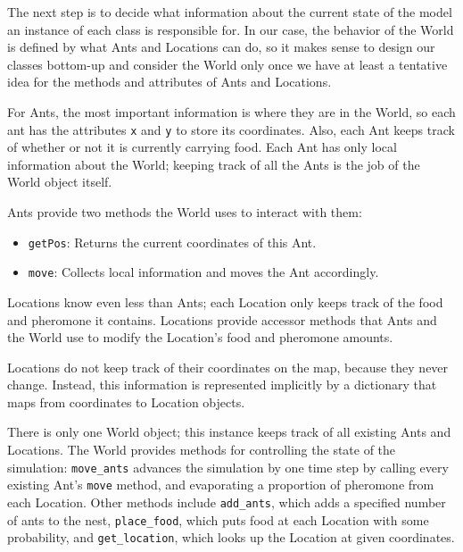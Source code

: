 \documentclass[10pt]{book}
\begin{document}
The next step is to decide what information about the current state of
the model an instance of each class is responsible for. In our case,
the behavior of the World is defined by what Ants and Locations
can do, so it makes sense to design our classes bottom-up and consider
the World only once we have at least a tentative idea for the methods
and attributes of Ants and Locations.

For Ants, the most important information is where they are in the
World, so each ant has the attributes \texttt{x} and \texttt{y} to
store its coordinates. Also, each Ant keeps track of whether or not it
is currently carrying food.  Each Ant has only local information about
the World; keeping track of all the Ants is the job of the World
object itself.

Ants provide two methods the World uses to interact with them:

\begin{itemize}

 \item \texttt{getPos}: Returns the current coordinates of this Ant.

 \item \texttt{move}:  Collects local information and moves the Ant accordingly.

\end{itemize}


Locations know even less than Ants; each Location only keeps track of
the food and pheromone it contains. Locations provide
accessor methods that Ants and the World
use to modify the Location's food and pheromone amounts.

Locations do not keep track of their
coordinates on the map, because they never change.  Instead, this information
is represented implicitly by a dictionary that maps from coordinates
to Location objects.

There is only one World object; this instance keeps track of all
existing Ants and Locations.  The World provides methods for controlling
the state of the simulation: \texttt{move\_ants}
advances the simulation by one time step by calling every
existing Ant's \texttt{move} method, and evaporating a
proportion of pheromone from each Location. Other methods
include \texttt{add\_ants}, which adds a specified number of ants to
the nest, \texttt{place\_food}, which puts food at each Location with
some probability, and \texttt{get\_location}, which
looks up the Location at given coordinates.
\end{document}
